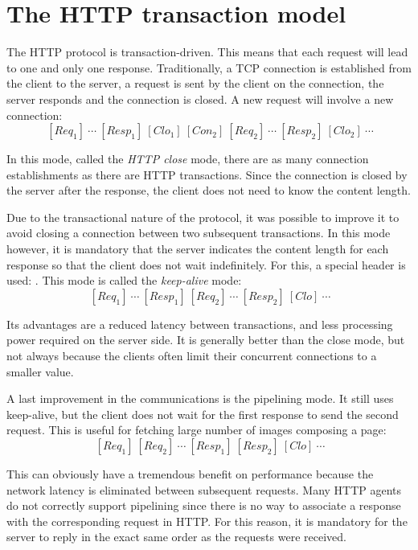 
\section{The HTTP transaction model}


The HTTP protocol is transaction-driven. This means that each request will lead
to one and only one response. Traditionally, a TCP connection is established
from the client to the server, a request is sent by the client on the
connection, the server responds and the connection is closed. A new request
will involve a new connection:
\begin{equation*}
[Con_1]\ [Req_1]\ \cdots\ [Resp_1]\ [Clo_1]\ [Con_2]\ [Req_2]\ \cdots\ [Resp_2]\ [Clo_2]\ \cdots
\end{equation*}

In this mode, called the \emph{HTTP close} mode, there are as many connection
establishments as there are HTTP transactions. Since the connection is closed
by the server after the response, the client does not need to know the content
length.

Due to the transactional nature of the protocol, it was possible to improve it
to avoid closing a connection between two subsequent transactions. In this mode
however, it is mandatory that the server indicates the content length for each
response so that the client does not wait indefinitely. For this, a special
header is used: . This mode is called
the \emph{keep-alive} mode:
\begin{equation*}
[Con]\ [Req_1]\ \cdots\ [Resp_1]\ [Req_2]\ \cdots\ [Resp_2]\ [Clo]\ \cdots
\end{equation*}

Its advantages are a reduced latency between transactions, and less processing
power required on the server side. It is generally better than the close mode,
but not always because the clients often limit their concurrent connections to
a smaller value.

A last improvement in the communications is the pipelining mode. It still uses
keep-alive, but the client does not wait for the first response to send the
second request. This is useful for fetching large number of images composing a
page:
\begin{equation*}
[Con]\ [Req_1]\ [Req_2]\ \cdots\ [Resp_1]\ [Resp_2]\ [Clo]\ \cdots
\end{equation*}

This can obviously have a tremendous benefit on performance because the network
latency is eliminated between subsequent requests. Many HTTP agents do not
correctly support pipelining since there is no way to associate a response with
the corresponding request in HTTP. For this reason, it is mandatory for the
server to reply in the exact same order as the requests were received.

